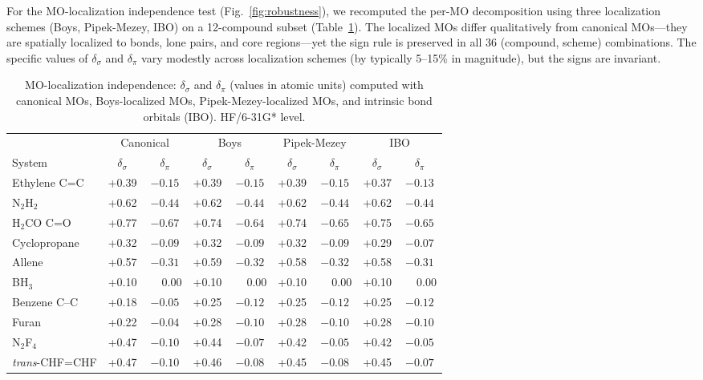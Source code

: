 \documentclass[11pt,a4paper]{article}
\newcommand{\delsg}{\delta_{\sigma}}
\newcommand{\delpi}{\delta_{\pi}}
\begin{document}
For the MO-localization independence test (Fig.~\ref{fig:robustness}), we recomputed the per-MO
decomposition using three localization schemes (Boys, Pipek-Mezey,
IBO) on a 12-compound subset (Table~\ref{tab:lmo}). The localized
MOs differ qualitatively from canonical MOs---they are spatially
localized to bonds, lone pairs, and core regions---yet the sign
rule is preserved in all 36 (compound, scheme) combinations. The
specific values of $\delsg$ and $\delpi$ vary modestly across
localization schemes (by typically 5--15\% in magnitude), but
the signs are invariant.

\begin{table}[t]
\centering
\caption{MO-localization independence: $\delsg$ and $\delpi$
(values in atomic units) computed with canonical MOs, Boys-localized
MOs, Pipek-Mezey-localized MOs, and intrinsic bond orbitals
(IBO). HF/6-31G* level.}
\label{tab:lmo}
\begin{tabular}{lcccccccc}
\toprule
& \multicolumn{2}{c}{Canonical} & \multicolumn{2}{c}{Boys} & \multicolumn{2}{c}{Pipek-Mezey} & \multicolumn{2}{c}{IBO} \\
\cmidrule(lr){2-3}\cmidrule(lr){4-5}\cmidrule(lr){6-7}\cmidrule(lr){8-9}
System & $\delsg$ & $\delpi$ & $\delsg$ & $\delpi$ & $\delsg$ & $\delpi$ & $\delsg$ & $\delpi$ \\
\midrule
Ethylene C=C       & +0.39 & $-0.15$ & +0.39 & $-0.15$ & +0.39 & $-0.15$ & +0.37 & $-0.13$ \\
N$_2$H$_2$         & +0.62 & $-0.44$ & +0.62 & $-0.44$ & +0.62 & $-0.44$ & +0.62 & $-0.44$ \\
H$_2$CO C=O        & +0.77 & $-0.67$ & +0.74 & $-0.64$ & +0.74 & $-0.65$ & +0.75 & $-0.65$ \\
Cyclopropane       & +0.32 & $-0.09$ & +0.32 & $-0.09$ & +0.32 & $-0.09$ & +0.29 & $-0.07$ \\
Allene             & +0.57 & $-0.31$ & +0.59 & $-0.32$ & +0.58 & $-0.32$ & +0.58 & $-0.31$ \\
BH$_3$             & +0.10 & $\phantom{-}0.00$ & +0.10 & $\phantom{-}0.00$ & +0.10 & $\phantom{-}0.00$ & +0.10 & $\phantom{-}0.00$ \\
Benzene C--C       & +0.18 & $-0.05$ & +0.25 & $-0.12$ & +0.25 & $-0.12$ & +0.25 & $-0.12$ \\
Furan              & +0.22 & $-0.04$ & +0.28 & $-0.10$ & +0.28 & $-0.10$ & +0.28 & $-0.10$ \\
N$_2$F$_4$         & +0.47 & $-0.10$ & +0.44 & $-0.07$ & +0.42 & $-0.05$ & +0.42 & $-0.05$ \\
\textit{trans}-CHF=CHF & +0.47 & $-0.10$ & +0.46 & $-0.08$ & +0.45 & $-0.08$ & +0.45 & $-0.07$ \\
\bottomrule
\end{tabular}
\end{table}
\end{document}
